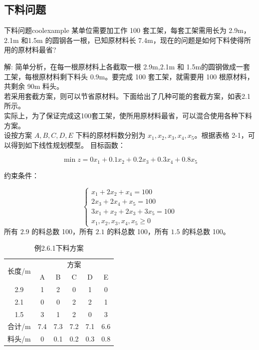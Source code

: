     \subsection{下料问题}
    \begin{exbox}{下料问题}{coolexample}
        某单位需要加工作 100 套工架，每套工架需用长为 2.9m，2.1m 和1.5m 的圆钢各一根，已知原材料长 7.4m，现在的问题是如何下料使得所用的原材料最省?

        解:
        简单分析，在每一根原材料上各截取一根 2.9m,2.1m 和 1.5m的圆钢做成一套工架，每根原材料剩下料头 0.9m。要完成 100 套工架，就需要用 100 根原材料，共剩余 90m 料头。
        \\若采用套截方案，则可以节省原材料。下面给出了几种可能的套截方案，如表2.1所示。\\
        实际上，为了保证完成这100套工架，使所用原材料最省，可以混合使用各种下料方案。\\
        设按方案 \( A, B, C, D, E \) 下料的原材料数分别为 \( x_1, x_2, x_3, x_4, x_5 \)。根据表格 2-1，可以得到如下线性规划模型。
        目标函数：

        \[
        \min z = 0x_1 + 0.1x_2 + 0.2x_3 + 0.3x_4 + 0.8x_5
        \]

        约束条件：

        \[
        \begin{cases}
        x_1 + 2x_2 + x_4 = 100 \\
        2x_3 + 2x_4 + x_5 = 100 \\
        3x_1 + x_2 + 2x_3 + 3x_5 = 100 \\
        x_1, x_2, x_3, x_4, x_5 \geq 0
        \end{cases}
        \]
        所有 \( 2.9 \) 的料总数 100，所有 \( 2.1 \) 的料总数 100，所有 \( 1.5 \) 的料总数 100。
    \end{exbox}

    \begin{table}[H]  %
        \centering
        \renewcommand{\arraystretch}{1.5} %
        \begin{tabular}{|c|c|c|c|c|c|}
        \hline
        \multirow{2}{*}{长度/m} & \multicolumn{5}{c|}{方案} \\ \cline{2-6} 
         & A & B & C & D & E \\ \hline
        2.9 & 1 & 2 & 0 & 1 & 0 \\ \hline
        2.1 & 0 & 0 & 2 & 2 & 1 \\ \hline
        1.5 & 3 & 1 & 2 & 0 & 3 \\ \hline
        合计/m & 7.4 & 7.3 & 7.2 & 7.1 & 6.6 \\ \hline
        料头/m & 0 & 0.1 & 0.2 & 0.3 & 0.8 \\ \hline
        \end{tabular}
        \caption{例2.6.1下料方案}
    \end{table}
        
